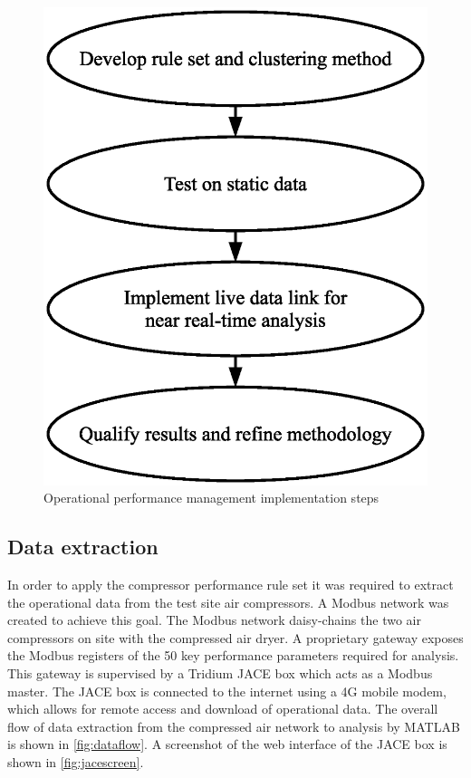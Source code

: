 \begin{figure}
\includegraphics[width = \columnwidth]{./Images/ImplementationSteps.eps}
\caption{Operational performance management implementation steps}
\label{fig:implementationsteps}
\end{figure}

\subsection{Data extraction}
In order to apply the compressor performance rule set it was required to extract the operational data from the test site air compressors. A Modbus network was created to achieve this goal. The Modbus network daisy-chains the two air compressors on site with the compressed air dryer. A proprietary gateway exposes the Modbus registers of the 50 key performance parameters required for analysis. This gateway is supervised by a Tridium JACE box which acts as a Modbus master. The JACE box is connected to the internet using a 4G mobile modem, which allows for remote access and download of operational data. The overall flow of data extraction from the compressed air network to analysis by MATLAB is shown in \autoref{fig:dataflow}. A screenshot of the web interface of the JACE box is shown in \autoref{fig:jacescreen}.


